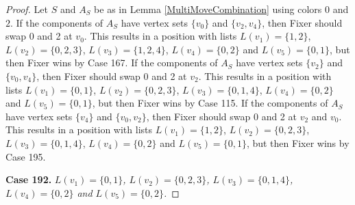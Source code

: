 \documentclass[12pt]{amsart}
\theoremstyle{plain}
\theoremstyle{definition}
\theoremstyle{remark}
\begin{document}
\begin{proof}
Let $S$ and $A_S$ be as in Lemma \ref{MultiMoveCombination} using colors $0$ and $2$. If the components of $A_S$ have vertex sets $\{v_0\}$ and $\{v_2, v_4\}$, then Fixer should swap 0 and 2 at $v_0$. This results in a position with lists $L(v_1) = \{1, 2\}$, $L(v_2) = \{0, 2, 3\}$, $L(v_3) = \{1, 2, 4\}$, $L(v_4) = \{0, 2\}$ and $L(v_5) = \{0, 1\}$, but then Fixer wins by Case 167.
If the components of $A_S$ have vertex sets $\{v_2\}$ and $\{v_0, v_4\}$, then Fixer should swap 0 and 2 at $v_2$. This results in a position with lists $L(v_1) = \{0, 1\}$, $L(v_2) = \{0, 2, 3\}$, $L(v_3) = \{0, 1, 4\}$, $L(v_4) = \{0, 2\}$ and $L(v_5) = \{0, 1\}$, but then Fixer wins by Case 115.
If the components of $A_S$ have vertex sets $\{v_4\}$ and $\{v_0, v_2\}$, then Fixer should swap 0 and 2 at $v_2$ and $v_0$. This results in a position with lists $L(v_1) = \{1, 2\}$, $L(v_2) = \{0, 2, 3\}$, $L(v_3) = \{0, 1, 4\}$, $L(v_4) = \{0, 2\}$ and $L(v_5) = \{0, 1\}$, but then Fixer wins by Case 195.

\noindent\textbf{Case 192.  }\textit{$L(v_1) = \{0, 1\}$, $L(v_2) = \{0, 2, 3\}$, $L(v_3) = \{0, 1, 4\}$, $L(v_4) = \{0, 2\}$ and $L(v_5) = \{0, 2\}$.}


\end{proof}
\end{document}
